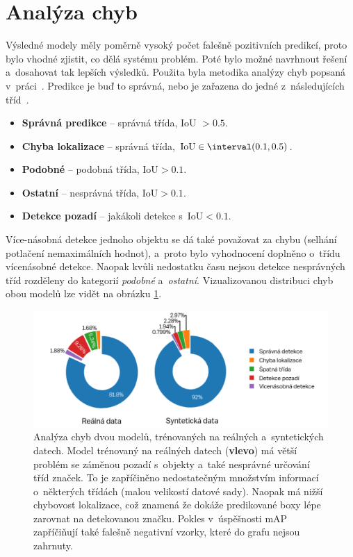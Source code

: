 \section{Analýza chyb}
Výsledné modely měly poměrně vysoký počet falešně pozitivních predikcí, proto bylo vhodné zjistit, co dělá systému problém. Poté bylo možné navrhnout řešení a~dosahovat tak lepších výsledků. Použita byla metodika analýzy chyb popsaná v~práci~\cite{errorAnalysis}. Predikce je buď to správná, nebo je zařazena do jedné z~následujících tříd~\cite{yolov1}.

\begin{itemize}
    \item \textbf{Správná predikce} -- správná třída, IoU $> 0.5$.
    \item \textbf{Chyba lokalizace} -- správná třída, $\text{IoU} \in \interval({0.1,0.5})$.
    \item \textbf{Podobné} -- podobná třída, $\text{IoU} > 0.1$.
    \item \textbf{Ostatní} -- nesprávná třída, $\text{IoU} > 0.1$.
    \item \textbf{Detekce pozadí} -- jakákoli detekce s~$\text{IoU} < 0.1$.
\end{itemize}

Více-násobná detekce jednoho objektu se dá také považovat za chybu (selhání potlačení nemaximálních hodnot), a~proto bylo vyhodnocení doplněno o~třídu vícenásobné detekce. Naopak kvůli nedostatku času nejsou detekce nesprávných tříd rozděleny do kategorií \emph{podobné} a~\emph{ostatní}. Vizualizovanou distribuci chyb obou modelů lze vidět na obrázku \ref{fig:analyzaChyb}.

\begin{figure}[H]\centering
    \centering
    \includegraphics[width=0.99\linewidth]{figures/vyhodnoceni/error_analysis.pdf}
    \caption{Analýza chyb dvou modelů, trénovaných na reálných a~syntetických datech. Model trénovaný na reálných datech (\textbf{vlevo}) má větší problém se záměnou pozadí s~objekty a~také nesprávné určování tříd značek. To je zapříčiněno nedostatečným množstvím informací o~některých třídách (malou velikostí datové sady). Naopak má nižší chybovost lokalizace, což znamená že dokáže predikované boxy lépe zarovnat na detekovanou značku. Pokles v~úspěšnosti mAP zapříčiňují také falešně negativní vzorky, které do grafu nejsou zahrnuty.}
    \label{fig:analyzaChyb}
\end{figure}